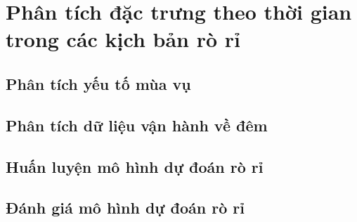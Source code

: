 \section{Phân tích đặc trưng theo thời gian trong các kịch bản rò rỉ}
\subsection{Phân tích yếu tố mùa vụ}
\subsection{Phân tích dữ liệu vận hành về đêm}

\subsection{Huấn luyện mô hình dự đoán rò rỉ}

\subsection{Đánh giá mô hình dự đoán rò rỉ}
